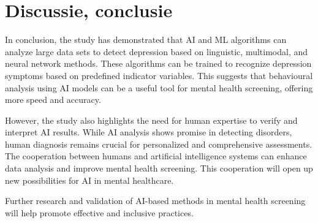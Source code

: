 \documentclass[dutch]{hogent-article}
\begin{document}
\section{Discussie, conclusie}%
\label{sec:discussion-conclusion}
In conclusion, the study has demonstrated that AI and ML algorithms can analyze large data sets to detect depression based on linguistic, multimodal, and neural network methods. These algorithms can be trained to recognize depression symptoms based on predefined indicator variables. This suggests that behavioural analysis using AI models can be a useful tool for mental health screening, offering more speed and accuracy.

However, the study also highlights the need for human expertise to verify and interpret AI results. While AI analysis shows promise in detecting disorders, human diagnosis remains crucial for personalized and comprehensive assessments. The cooperation between humans and artificial intelligence systems can enhance data analysis and improve mental health screening. This cooperation will open up new possibilities for AI in mental healthcare.

Further research and validation of AI-based methods in mental health screening will help promote effective and inclusive practices.




\printbibliography[heading=bibintoc]
\end{document}
